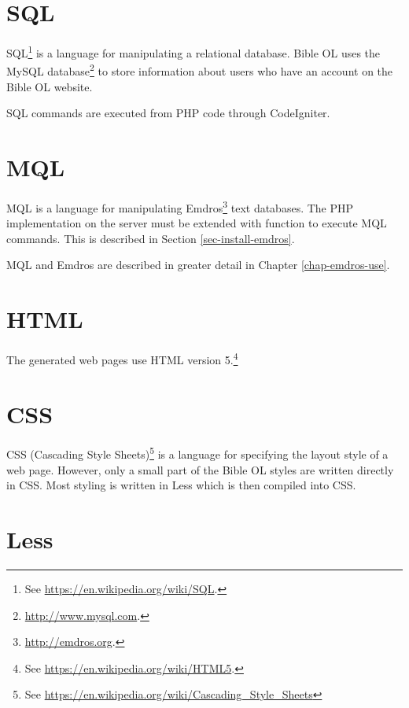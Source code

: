 \documentclass[11pt,oneside,a4paper]{memoir}
\begin{document}
\section{SQL}

SQL\footnote{See \url{https://en.wikipedia.org/wiki/SQL}.} is a language for manipulating a
relational database. Bible OL uses the MySQL database\footnote{\url{http://www.mysql.com}.} to store
information about users who have an account on the Bible OL website.

SQL commands are executed from PHP code through CodeIgniter.


\section{MQL}\label{sec-mql}

MQL is a language for manipulating Emdros\footnote{\url{http://emdros.org}.} text
databases. The PHP implementation on the server must be extended with function to execute MQL
commands. This is described in Section \ref{sec-install-emdros}.

MQL and Emdros are described in greater detail in Chapter \ref{chap-emdros-use}.



\section{HTML}

The generated web pages use HTML version 5.\footnote{See \url{https://en.wikipedia.org/wiki/HTML5}.}


\section{CSS}\label{sec-css}

CSS (Cascading Style Sheets)\footnote{See
  \url{https://en.wikipedia.org/wiki/Cascading_Style_Sheets}} is a language for specifying the
layout style of a web page. However, only a small part of the Bible OL styles are written directly
in CSS. Most styling is written in Less which is then compiled into CSS.


\section{Less}\label{sec-less}
\end{document}
